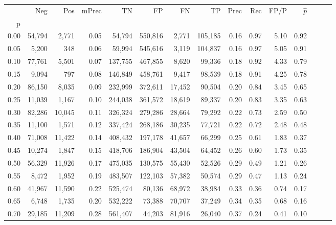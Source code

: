 \begin{tabular}{rrrrrrrrrrrrrrr}
\toprule
{} &     Neg &     Pos & mPrec &       TN &       FP &       FN &       TP &  Prec &   Rec &  FP/P & $\hat{p}$ \\
p    &         &         &       &          &          &          &          &       &       &       &           \\
\midrule
0.00 &  54,794 &   2,771 &  0.05 &   54,794 &  550,816 &    2,771 &  105,185 &  0.16 &  0.97 &  5.10 &      0.92 \\
0.05 &   5,200 &     348 &  0.06 &   59,994 &  545,616 &    3,119 &  104,837 &  0.16 &  0.97 &  5.05 &      0.91 \\
0.10 &  77,761 &   5,501 &  0.07 &  137,755 &  467,855 &    8,620 &   99,336 &  0.18 &  0.92 &  4.33 &      0.79 \\
0.15 &   9,094 &     797 &  0.08 &  146,849 &  458,761 &    9,417 &   98,539 &  0.18 &  0.91 &  4.25 &      0.78 \\
0.20 &  86,150 &   8,035 &  0.09 &  232,999 &  372,611 &   17,452 &   90,504 &  0.20 &  0.84 &  3.45 &      0.65 \\
0.25 &  11,039 &   1,167 &  0.10 &  244,038 &  361,572 &   18,619 &   89,337 &  0.20 &  0.83 &  3.35 &      0.63 \\
0.30 &  82,286 &  10,045 &  0.11 &  326,324 &  279,286 &   28,664 &   79,292 &  0.22 &  0.73 &  2.59 &      0.50 \\
0.35 &  11,100 &   1,571 &  0.12 &  337,424 &  268,186 &   30,235 &   77,721 &  0.22 &  0.72 &  2.48 &      0.48 \\
0.40 &  71,008 &  11,422 &  0.14 &  408,432 &  197,178 &   41,657 &   66,299 &  0.25 &  0.61 &  1.83 &      0.37 \\
0.45 &  10,274 &   1,847 &  0.15 &  418,706 &  186,904 &   43,504 &   64,452 &  0.26 &  0.60 &  1.73 &      0.35 \\
0.50 &  56,329 &  11,926 &  0.17 &  475,035 &  130,575 &   55,430 &   52,526 &  0.29 &  0.49 &  1.21 &      0.26 \\
0.55 &   8,472 &   1,952 &  0.19 &  483,507 &  122,103 &   57,382 &   50,574 &  0.29 &  0.47 &  1.13 &      0.24 \\
0.60 &  41,967 &  11,590 &  0.22 &  525,474 &   80,136 &   68,972 &   38,984 &  0.33 &  0.36 &  0.74 &      0.17 \\
0.65 &   6,748 &   1,735 &  0.20 &  532,222 &   73,388 &   70,707 &   37,249 &  0.34 &  0.35 &  0.68 &      0.16 \\
0.70 &  29,185 &  11,209 &  0.28 &  561,407 &   44,203 &   81,916 &   26,040 &  0.37 &  0.24 &  0.41 &      0.10 \\

\end{tabular}
